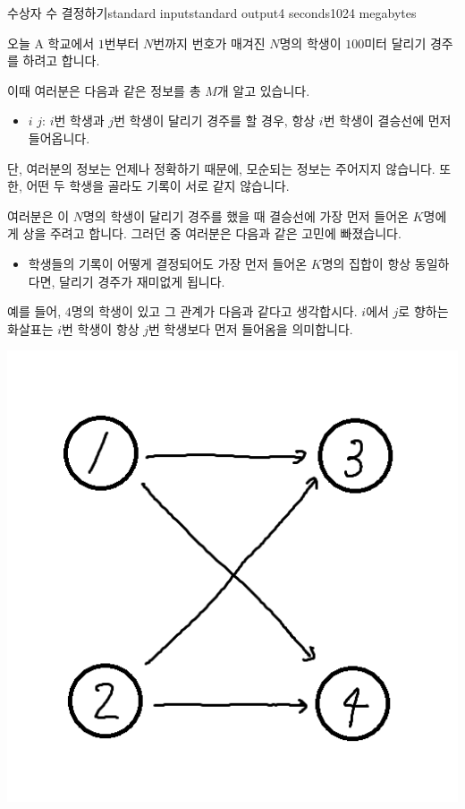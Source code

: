 \begin{problem}{수상자 수 결정하기}{standard input}{standard output}{4 seconds}{1024 megabytes}

오늘 A 학교에서 $1$번부터 $N$번까지 번호가 매겨진 $N$명의 학생이 $100$미터 달리기 경주를 하려고 합니다.

이때 여러분은 다음과 같은 정보를 총 $M$개 알고 있습니다.

\begin{itemize}
\item $i$ $j$: $i$번 학생과 $j$번 학생이 달리기 경주를 할 경우, 항상 $i$번 학생이 결승선에 먼저 들어옵니다.
\end{itemize}

단, 여러분의 정보는 언제나 정확하기 때문에, 모순되는 정보는 주어지지 않습니다. 또한, 어떤 두 학생을 골라도 기록이 서로 같지 않습니다.

여러분은 이 $N$명의 학생이 달리기 경주를 했을 때 결승선에 가장 먼저 들어온 $K$명에게 상을 주려고 합니다. 그러던 중 여러분은 다음과 같은 고민에 빠졌습니다.

\begin{itemize}
\item 학생들의 기록이 어떻게 결정되어도 가장 먼저 들어온 $K$명의 집합이 항상 동일하다면, 달리기 경주가 재미없게 됩니다.
\end{itemize}

예를 들어, $4$명의 학생이 있고 그 관계가 다음과 같다고 생각합시다. $i$에서 $j$로 향하는 화살표는 $i$번 학생이 항상 $j$번 학생보다 먼저 들어옴을 의미합니다.

\begin{center}
  \includegraphics[scale=0.5]{winnerset.png}
\end{center}


\end{problem}
